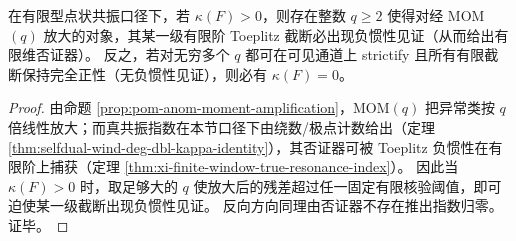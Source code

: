 \begin{theorem}[放大可检测性：真共振 \texorpdfstring{$\Rightarrow$}{=>} 有限维否证器]\label{thm:xi-mom-amplify-detect-true-resonance}
在有限型点状共振口径下，若 \(\kappa(F)>0\)，则存在整数 \(q\ge 2\) 使得对经 MOM\((q)\) 放大的对象，其某一级有限阶 Toeplitz 截断必出现负惯性见证（从而给出有限维否证器）。
反之，若对无穷多个 \(q\) 都可在可见通道上 strictify 且所有有限截断保持完全正性（无负惯性见证），则必有 \(\kappa(F)=0\)。
\end{theorem}

\begin{proof}
由命题 \ref{prop:pom-anom-moment-amplification}，MOM\((q)\) 把异常类按 \(q\) 倍线性放大；而真共振指数在本节口径下由绕数/极点计数给出（定理 \ref{thm:selfdual-wind-deg-dbl-kappa-identity}），其否证器可被 Toeplitz 负惯性在有限阶上捕获（定理 \ref{thm:xi-finite-window-true-resonance-index}）。
因此当 \(\kappa(F)>0\) 时，取足够大的 \(q\) 使放大后的残差超过任一固定有限核验阈值，即可迫使某一级截断出现负惯性见证。
反向方向同理由否证器不存在推出指数归零。证毕。
\end{proof}

\endinput
